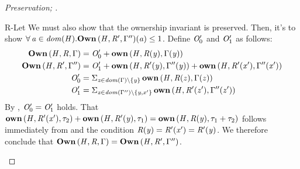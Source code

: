 \begin{proof}[Preservation; ]
\begin{rneqncase}{R-Let}
    We must also show that the ownership invariant is preserved.
    Then, it's to show $\forall \,  \mathit{a}  \in \mathit{dom}( \mathit{H} )   .  \mathbf{Own} \, (  \mathit{H}  ,  \mathit{R'}  ,  \Gamma''  )  (  \mathit{a}  )  \le  1$. Define $\mathit{O'_{{\mathrm{0}}}}$ and $\mathit{O'_{{\mathrm{1}}}}$ as follows:
    \begin{align*}
    \mathbf{Own} \, (  \mathit{H}  ,  \mathit{R}  ,  \Gamma  ) & = \mathit{O'_{{\mathrm{0}}}}  +  \mathbf{own} \, (  \mathit{H}  ,  \mathit{R}  (  \mathit{y}  )  ,  \Gamma  (  \mathit{y}  )  ) \\ 
    \mathbf{Own} \, (  \mathit{H}  ,  \mathit{R'}  ,  \Gamma''  ) & = \mathit{O'_{{\mathrm{1}}}}  +  \mathbf{own} \, (  \mathit{H}  ,  \mathit{R'}  (  \mathit{y}  )  ,  \Gamma''  (  \mathit{y}  )  )  +  \mathbf{own} \, (  \mathit{H}  ,  \mathit{R'}  (  \mathit{x'}  )  ,  \Gamma''  (  \mathit{x'}  )  ) \\
    \mathit{O'_{{\mathrm{0}}}} & =  \Sigma _{ \mathit{z} \in   \mathit{dom}( \Gamma )   \setminus   \left\{{ \mathit{y} }\right\}   }\, \mathbf{own} \, (  \mathit{H}  ,  \mathit{R}  (  \mathit{z}  )  ,  \Gamma  (  \mathit{z}  )  )  \\
    \mathit{O'_{{\mathrm{1}}}} & =  \Sigma _{ \mathit{z} \in   \mathit{dom}( \Gamma'' )   \setminus  \{  \mathit{y}  ,  \mathit{x'}  \}  }\, \mathbf{own} \, (  \mathit{H}  ,  \mathit{R'}  (  \mathit{z'}  )  ,  \Gamma''  (  \mathit{z'}  )  ) 
    \end{align*}
    By , $\mathit{O'_{{\mathrm{0}}}}  =  \mathit{O'_{{\mathrm{1}}}}$ holds.
    That $\mathbf{own} \, (  \mathit{H}  ,  \mathit{R'}  (  \mathit{x'}  )  ,  \tau_{{\mathrm{2}}}  )  +  \mathbf{own} \, (  \mathit{H}  ,  \mathit{R'}  (  \mathit{y}  )  ,  \tau_{{\mathrm{1}}}  )  =  \mathbf{own} \, (  \mathit{H}  ,  \mathit{R}  (  \mathit{y}  )  ,  \tau_{{\mathrm{1}}}  +  \tau_{{\mathrm{2}}}  )$ follows immediately
    from  and the condition $\mathit{R}  (  \mathit{y}  )  =  \mathit{R'}  (  \mathit{x'}  )  =  \mathit{R'}  (  \mathit{y}  )$.
    We therefore conclude that $\mathbf{Own} \, (  \mathit{H}  ,  \mathit{R}  ,  \Gamma  )  =  \mathbf{Own} \, (  \mathit{H}  ,  \mathit{R'}  ,  \Gamma''  )$.
  \end{rneqncase} %
 

\end{proof}
